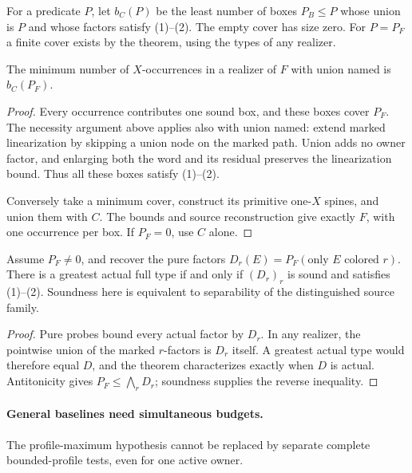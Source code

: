 For a predicate $P$, let $b_C(P)$ be the least number of boxes $P_B\leq P$
whose union is $P$ and whose factors satisfy (1)--(2). The empty cover has size zero.
For $P=P_F$ a finite cover exists by the theorem, using the types of any
realizer.

\begin{corollary}
\label{core:cor:profile-interval-copy-number}
The minimum number of $X$-occurrences in a realizer of $F$ with union
named is $b_C(P_F)$.
\end{corollary}
\begin{proof}
Every occurrence contributes one sound box, and these boxes cover $P_F$.
The necessity argument above applies also with union named: extend marked
linearization by skipping a union node on the marked path. Union adds no
owner factor, and enlarging both the word and its residual preserves the
linearization bound. Thus all these boxes satisfy (1)--(2).

Conversely take a minimum cover, construct its primitive one-$X$ spines,
and union them with $C$. The bounds and source reconstruction give exactly
$F$, with one occurrence per box. If $P_F=0$, use $C$ alone.
\end{proof}

\begin{corollary}
\label{core:cor:profile-interval-greatest-type}
Assume $P_F\ne0$, and recover the pure factors
$D_r(E)=P_F(\text{only }E\text{ colored }r)$.
There is a greatest actual full type if and only if $(D_r)_r$ is sound
and satisfies (1)--(2). Soundness here is equivalent to separability of
the distinguished source family.
\end{corollary}
\begin{proof}
Pure probes bound every actual factor by $D_r$. In any realizer, the
pointwise union of the marked $r$-factors is $D_r$ itself. A greatest
actual type would therefore equal $D$, and the theorem characterizes
exactly when $D$ is actual. Antitonicity gives
$P_F\leq\bigwedge_rD_r$; soundness supplies the reverse inequality.
\end{proof}

\paragraph{General baselines need simultaneous budgets.}
The profile-maximum hypothesis cannot be replaced by separate complete
bounded-profile tests, even for one active owner.

